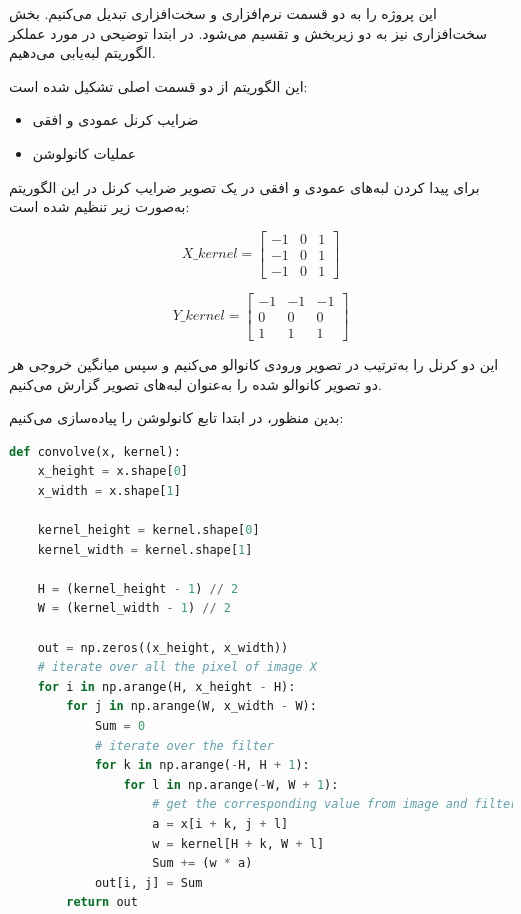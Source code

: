 \begin{qsolve}
	این پروژه را به دو قسمت نرم‌افزاری و سخت‌افزاری تبدیل می‌کنیم. بخش سخت‌افزاری نیز به دو زیربخش  و  تقسیم می‌شود. در ابتدا توضیحی در مورد عملکر الگوریتم لبه‌یابی  می‌دهیم.
	
	این الگوریتم از دو قسمت اصلی تشکیل شده است:
	\begin{itemize}
		\item ضرایب کرنل عمودی و افقی
		\item عملیات کانولوشن
	\end{itemize}
	
	برای پیدا کردن لبه‌های عمودی و افقی در یک تصویر ضرایب کرنل در این الگوریتم به‌صورت زیر تنظیم شده است:
	
	\begin{equation*}
		X\_kernel = 
		\begin{bmatrix}
			-1 & 0 & 1 \\
			-1 & 0 & 1 \\
			-1 & 0 & 1
		\end{bmatrix}
	\end{equation*}
	
	
	\begin{equation*}
		Y\_kernel = 
		\begin{bmatrix}
			-1 & -1 & -1 \\
			 0 & 0 & 0 \\
			 1 & 1 & 1
		\end{bmatrix}
	\end{equation*}
	
	این دو کرنل را به‌ترتیب در تصویر ورودی کانوالو می‌کنیم و سپس میانگین خروجی هر دو تصویر کانوالو شده را به‌عنوان لبه‌های تصویر گزارش می‌کنیم.
	
	بدین منظور، در ابتدا تابع کانولوشن را پیاده‌سازی می‌کنیم:
\end{qsolve}





\begin{latin}
\begin{lstlisting}[language=Python,caption={Convolution Function}]
def convolve(x, kernel):
	x_height = x.shape[0]
	x_width = x.shape[1]
	
	kernel_height = kernel.shape[0]
	kernel_width = kernel.shape[1]
	
	H = (kernel_height - 1) // 2
	W = (kernel_width - 1) // 2
	
	out = np.zeros((x_height, x_width))
	# iterate over all the pixel of image X
	for i in np.arange(H, x_height - H):
		for j in np.arange(W, x_width - W):
			Sum = 0
			# iterate over the filter
			for k in np.arange(-H, H + 1):
				for l in np.arange(-W, W + 1):
					# get the corresponding value from image and filter
					a = x[i + k, j + l]
					w = kernel[H + k, W + l]
					Sum += (w * a)
			out[i, j] = Sum
		return out
\end{lstlisting}
\end{latin}




